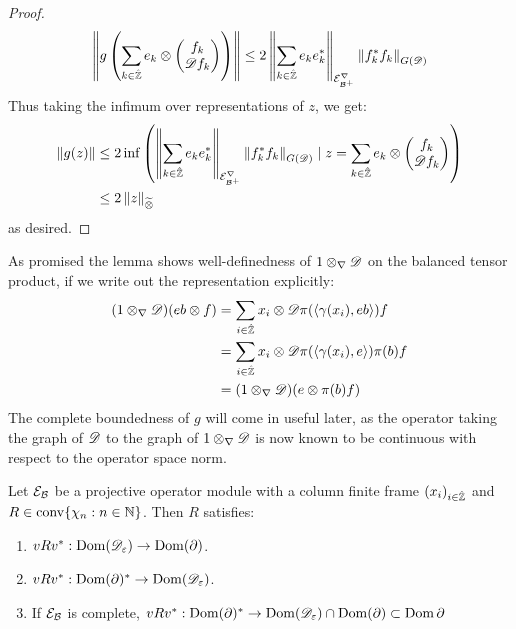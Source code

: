 \begin{proof}
	\begin{align*}
		\left \Vert g\left ( \sum_{k\in \hat{\mathbb{Z}}} e_k \otimes \begin{pmatrix} f_k \\ \mathscr{D} f_k \end{pmatrix} \right ) \right \Vert\leq 2\left \Vert \sum_{k\in \hat{\mathbb{Z}}} e_ke_k^* \right \Vert_{\mathcal{E}^\nabla_{\mathcal{B}^+}}\left \Vert f_k^*f_k \right \Vert_{G(\mathscr{D})}
	\end{align*}
	Thus taking the infimum over representations of $z$, we get:
	\begin{align*}
		\left \Vert g(z) \right \Vert&\leq 2\inf\left ( \left \Vert \sum_{k\in \hat{\mathbb{Z}}} e_ke_k^* \right \Vert_{\mathcal{E}^\nabla_{\mathcal{B}^+}}\left \Vert f_k^*f_k \right \Vert_{G(\mathscr{D})} \mid z=\sum_{k\in \hat{\mathbb{Z}}} e_k \otimes \begin{pmatrix} f_k \\ \mathscr{D} f_k \end{pmatrix} \right ) \\
		&\leq 2\left \Vert z \right \Vert_{\widetilde{\otimes}}
	\end{align*}
	as desired. 
\end{proof}
As promised the lemma shows well-definedness of $1\otimes_\nabla \mathscr{D}$ on the balanced tensor product, if we write out the representation explicitly:
\begin{align*}
	(1\otimes_{\nabla} \mathscr{D})(eb \otimes f)&=\sum_{i\in \hat{\mathbb{Z}}} x_i \otimes \mathscr{D}\pi(\left \langle \gamma(x_i),eb \right \rangle)f \\
	&=\sum_{i\in \hat{\mathbb{Z}}} x_i \otimes \mathscr{D}\pi(\left \langle \gamma(x_i),e \right \rangle) \pi(b)f \\
	&=(1\otimes_{\nabla} \mathscr{D})(e\otimes \pi(b) f)
\end{align*}
The complete boundedness of $g$ will come in useful later, as the operator taking the graph of $\mathscr{D}$ to the graph of $1\otimes_\nabla \mathscr{D}$ is now known to be continuous with respect to the operator space norm. 
\begin{lemma}\label{mesrennie315}
	Let $\mathcal{E}_{\mathcal{B}}$ be a projective operator module with a column finite frame $(x_i)_{i\in \hat{\mathbb{Z}}}$ and $R\in \operatorname{conv}\{\chi_n:n\in \mathbb{N}\}$. Then $R$ satisfies:
	\begin{enumerate}
	\item
		$vRv^*:\operatorname{Dom}(\mathscr{D}_\varepsilon)\to \operatorname{Dom} (\partial)$.
	\item
		$vRv^*:\operatorname{Dom} (\partial)^*\to \operatorname{Dom} (\mathscr{D}_\varepsilon)$. 
	\item
		If $\mathcal{E}_{\mathcal{B}}$ is complete, $vRv^*: \operatorname{Dom} (\partial)^* \to \operatorname{Dom} (\mathscr{D}_\varepsilon) \cap \operatorname{Dom} (\partial)\subset \operatorname{Dom} \partial$ 
	\end{enumerate}
\end{lemma}
